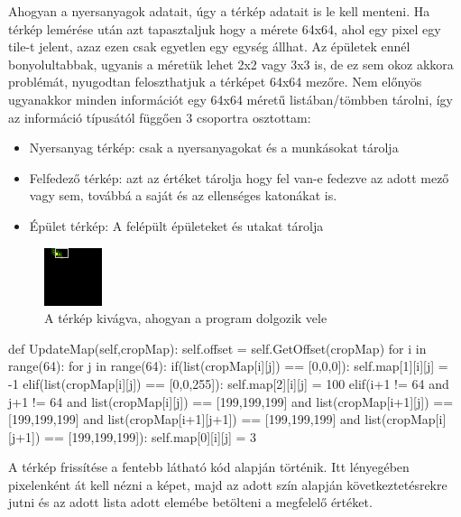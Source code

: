 Ahogyan a nyersanyagok adatait, úgy a térkép adatait is le kell menteni. Ha térkép lemérése után azt tapasztaljuk hogy a mérete 64x64, ahol egy pixel egy tile-t jelent, azaz ezen csak egyetlen egy egység állhat. Az épületek ennél bonyolultabbak, ugyanis a méretük lehet 2x2 vagy 3x3 is, 
de ez sem okoz akkora problémát, nyugodtan feloszthatjuk a térképet 64x64 mezőre. Nem előnyös ugyanakkor minden információt egy 64x64 méretű listában/tömbben tárolni, így az információ típusától függően 3 csoportra osztottam:

\begin{itemize}
    \item Nyersanyag térkép: csak a nyersanyagokat és a munkásokat tárolja
    \item Felfedező térkép: azt az értéket tárolja hogy fel van-e fedezve az adott mező vagy sem, továbbá a saját és az ellenséges katonákat is.
    \item Épület térkép: A felépült épületeket és utakat tárolja 
\end{itemize}


\begin{figure}[h]
    \centering
    \includegraphics[scale=2]{images/map.png}
    \caption{A térkép kivágva, ahogyan a program dolgozik vele}
    \label{fig:map}
\end{figure}

\begin{python}
def UpdateMap(self,cropMap):
    self.offset = self.GetOffset(cropMap)
    for i in range(64):
        for j in range(64):
            if(list(cropMap[i][j]) == [0,0,0]):
                self.map[1][i][j] = -1
            elif(list(cropMap[i][j]) == [0,0,255]):
                self.map[2][i][j] = 100
            elif(i+1 != 64 and j+1 != 64 
            and list(cropMap[i][j]) == [199,199,199] 
            and list(cropMap[i+1][j]) == [199,199,199] 
            and list(cropMap[i+1][j+1]) == [199,199,199] 
            and list(cropMap[i][j+1]) == [199,199,199]):
                self.map[0][i][j] = 3    
\end{python}

A térkép frissítése a fentebb látható kód alapján történik. Itt lényegében pixelenként át kell nézni a képet, majd az adott szín alapján következtetésrekre jutni és az adott lista adott elemébe betölteni a megfelelő értéket.

